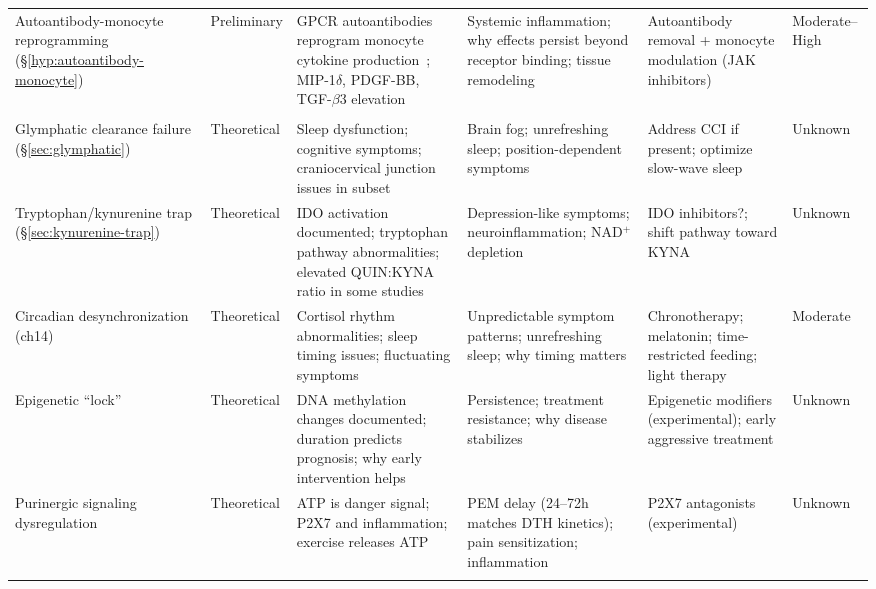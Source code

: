 \begin{landscape}
\begin{longtable}{p{2.8cm}p{1.8cm}p{4.3cm}p{4.3cm}p{3.9cm}p{2.2cm}}
Auto\-anti\-body-mono\-cyte re\-pro\-gram\-ming (\S\ref{hyp:autoantibody-monocyte}) & Pre\-lim\-i\-nary & GPCR auto\-anti\-bodies re\-pro\-gram mono\-cyte cy\-to\-kine pro\-duc\-tion~\cite{Hackel2025monocyte}; MIP-1$\delta$, PDGF-BB, TGF-$\beta$3 el\-e\-va\-tion & Sys\-tem\-ic in\-flam\-ma\-tion; why ef\-fects per\-sist be\-yond re\-cep\-tor bind\-ing; tis\-sue re\-mod\-el\-ing & Auto\-anti\-body re\-mov\-al + mono\-cyte mod\-u\-la\-tion (JAK in\-hib\-i\-tors) & Moderate--High \\
\addlinespace

\multicolumn{6}{l}{\textbf{TIER 4: THEORETICAL}} \\
\addlinespace

Glymphatic clearance failure (\S\ref{sec:glymphatic}) & Theoretical & Sleep dys\-function; cognitive symptoms; cranio\-cervical junction issues in subset & Brain fog; un\-refreshing sleep; position-dependent symptoms & Address CCI if present; optimize slow-wave sleep & Unknown \\
\addlinespace

Trypto\-phan/\allowbreak kynure\-nine trap (\S\ref{sec:kynurenine-trap}) & Theoretical & IDO acti\-vation docu\-mented; trypto\-phan pathway abnor\-malities; elevated QUIN:\allowbreak KYNA ratio in some studies & Depression-like symptoms; neuro\-inflam\-mation; NAD$^+$ depletion & IDO inhi\-bitors?; shift pathway toward KYNA & Unknown \\
\addlinespace

Circadian de\-syn\-chroni\-zation (ch14) & Theoretical & Cortisol rhythm abnor\-malities; sleep timing issues; fluc\-tuating symptoms & Un\-pre\-dictable symptom patterns; un\-refreshing sleep; why timing matters & Chrono\-therapy; mela\-tonin; time-restricted feeding; light therapy & Moderate \\
\addlinespace

Epi\-genetic ``lock'' & Theoretical & DNA methy\-lation changes docu\-mented; duration predicts prognosis; why early inter\-vention helps & Persist\-ence; treatment resist\-ance; why disease stabi\-lizes & Epi\-genetic modi\-fiers (experi\-mental); early aggres\-sive treatment & Unknown \\
\addlinespace

Purinergic signaling dysregulation & Theoretical & ATP is danger signal; P2X7 and inflammation; exercise releases ATP & PEM delay (24--72h matches DTH kinetics); pain sensitization; inflammation & P2X7 antagonists (experimental) & Unknown \\
\addlinespace


\end{longtable}
\end{landscape}
